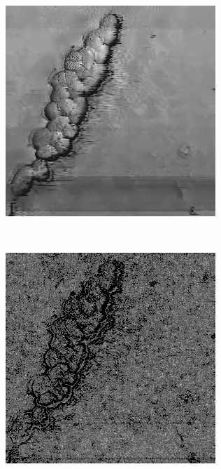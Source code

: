 \documentclass[../main.tex]{subfiles}
\begin{document}
\begin{figure}[!ht]
\begin{subfigure}{0.3\linewidth}
	\end{subfigure}
	\hfill
	\begin{subfigure}{0.3\linewidth}
		\centering
		\includegraphics[keepaspectratio, width=\linewidth]{images/ef_o2a_bm3d.png}
	\end{subfigure}\\[20pt]
	\begin{subfigure}{0.3\linewidth}
		\centering
		\includegraphics[keepaspectratio, width=\linewidth]{images/orig_grad.png}

\end{subfigure}
\end{figure}
\end{document}
